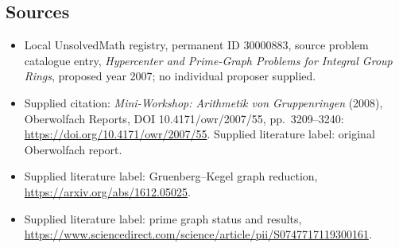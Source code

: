 \documentclass[11pt]{article}
\begin{document}
\subsection{Sources}
\begin{itemize}\item Local UnsolvedMath registry, permanent ID 30000883, source problem catalogue entry, \emph{Hypercenter and Prime-Graph Problems for Integral Group Rings}, proposed year 2007; no individual proposer supplied.\item Supplied citation: \emph{Mini-Workshop: Arithmetik von Gruppenringen} (2008), Oberwolfach Reports, DOI 10.4171/owr/2007/55, pp.\ 3209--3240: \url{https://doi.org/10.4171/owr/2007/55}. Supplied literature label: original Oberwolfach report.\item Supplied literature label: Gruenberg--Kegel graph reduction, \url{https://arxiv.org/abs/1612.05025}.\item Supplied literature label: prime graph status and results, \url{https://www.sciencedirect.com/science/article/pii/S0747717119300161}.\end{itemize}
\end{document}

